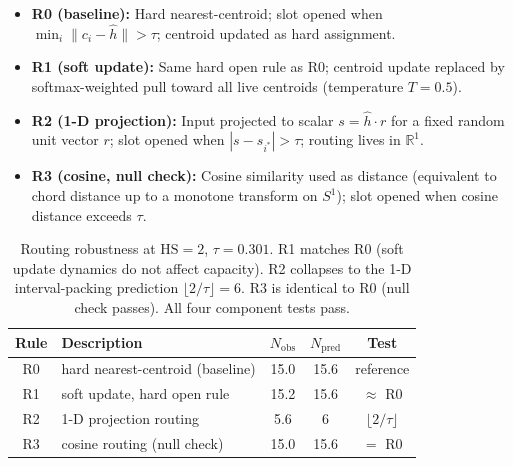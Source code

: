 \documentclass[11pt]{article}
\begin{document}
\begin{itemize}
  \item \textbf{R0 (baseline):} Hard nearest-centroid; slot opened when
        $\min_i \|c_i - \hat{h}\| > \tau$; centroid updated as hard assignment.
  \item \textbf{R1 (soft update):} Same hard open rule as R0; centroid update
        replaced by softmax-weighted pull toward all live centroids
        (temperature $T=0.5$).
  \item \textbf{R2 (1-D projection):} Input projected to scalar
        $s = \hat{h} \cdot r$ for a fixed random unit vector $r$;
        slot opened when $|s - s_{i^*}| > \tau$; routing lives in $\mathbb{R}^1$.
  \item \textbf{R3 (cosine, null check):} Cosine similarity used as distance
        (equivalent to chord distance up to a monotone transform on $S^1$);
        slot opened when cosine distance exceeds $\tau$.
\end{itemize}

\begin{table}[h]
\centering
\begin{tabular}{clccc}
\toprule
Rule & Description & $N_{\mathrm{obs}}$ & $N_{\mathrm{pred}}$ & Test \\
\midrule
R0 & hard nearest-centroid (baseline)      & 15.0 & 15.6 & reference \\
R1 & soft update, hard open rule           & 15.2 & 15.6 & $\approx$ R0 \\
R2 & 1-D projection routing               &  5.6 &  6   & $\lfloor 2/\tau \rfloor$ \\
R3 & cosine routing (null check)           & 15.0 & 15.6 & $=$ R0 \\
\bottomrule
\end{tabular}
\caption{Routing robustness at $\mathrm{HS}=2$, $\tau=0.301$.
R1 matches R0 (soft update dynamics do not affect capacity).
R2 collapses to the 1-D interval-packing prediction $\lfloor 2/\tau\rfloor = 6$.
R3 is identical to R0 (null check passes).
All four component tests pass.}
\label{tab:routing}
\end{table}
\end{document}
